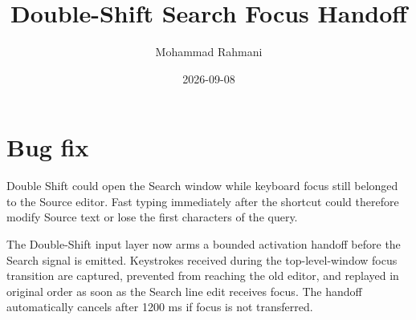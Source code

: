 \documentclass[a4paper]{article}
\title{Double-Shift Search Focus Handoff}
\date{2026-09-08}
\author{Mohammad Rahmani}
\begin{document}
   \maketitle

   \section{Bug fix}
   Double Shift could open the Search window while keyboard focus still belonged
   to the Source editor. Fast typing immediately after the shortcut could
   therefore modify Source text or lose the first characters of the query.

   The Double-Shift input layer now arms a bounded activation handoff before the
   Search signal is emitted. Keystrokes received during the top-level-window
   focus transition are captured, prevented from reaching the old editor, and
   replayed in original order as soon as the Search line edit receives focus.
   The handoff automatically cancels after 1200 ms if focus is not transferred.

   
   
\end{document}
